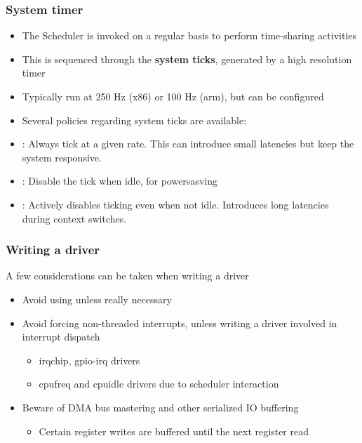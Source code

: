 \begin{frame}
	\frametitle{System timer}
	\begin{itemize}
		\item The Scheduler is invoked on a regular basis to perform time-sharing activities
		\item This is sequenced through the \textbf{system ticks}, generated by a high resolution timer
		\item Typically run at 250 Hz (x86) or 100 Hz (arm), but can be configured
		\item Several policies regarding system ticks are available:
		\item {}: Always tick at a given rate. This can introduce small latencies but keep the system responsive.
		\item {}: Disable the tick when idle, for powersasving
		\item {}: Actively disables ticking even when not idle. Introduces long latencies during context switches.
	\end{itemize}
\end{frame}


\begin{frame}
		\frametitle{Writing a driver}
A few considerations can be taken when writing a driver
		\begin{itemize}
			\item Avoid using  unless really necessary
			\item Avoid forcing non-threaded interrupts, unless writing a driver involved in interrupt dispatch
				\begin{itemize}
					\item irqchip, gpio-irq drivers
					\item cpufreq and cpuidle drivers due to scheduler interaction
				\end{itemize}
			\item Beware of DMA bus mastering and other serialized IO buffering
				\begin{itemize}
					\item Certain register writes are buffered until the next register read
				\end{itemize}
		\end{itemize}
\end{frame}
